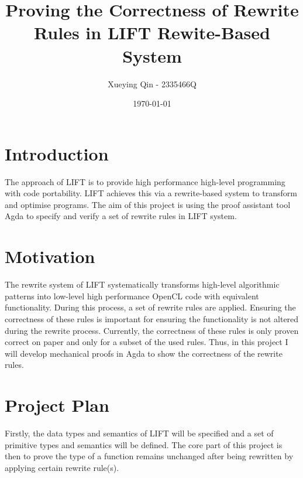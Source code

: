 \documentclass[]{article}
\begin{document}
%

\title{Proving the Correctness of Rewrite Rules in LIFT Rewite-Based System}
\author{Xueying Qin - 2335466Q}
\date{\small\today}

\maketitle

\section{Introduction}
The approach of LIFT is to provide high performance high-level programming with code portability. 
LIFT achieves this via a rewrite-based system to transform and optimise programs. The aim of this 
project is using the proof assistant tool Agda to specify and verify a set of rewrite rules in LIFT 
system.

\section{Motivation}
The rewrite system of LIFT systematically transforms high-level algorithmic patterns into low-level 
high performance OpenCL code with equivalent functionality. During this process, a set of rewrite 
rules are applied. Ensuring the correctness of these rules is important for ensuring the functionality 
is not altered during the rewrite process. Currently, the correctness of these rules is only proven 
correct on paper and only for a subset of the used rules. Thus, in this project I will develop 
mechanical proofs in Agda to show the correctness of the rewrite rules.

\section{Project Plan}
Firstly, the data types and semantics of LIFT will be specified and a set of primitive types and semantics 
will be defined. The core part of this project is then to prove the type of a function remains unchanged 
after being rewritten by applying certain rewrite rule(s).
\end{document}
